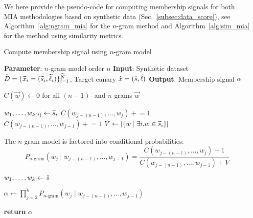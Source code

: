 We here provide the pseudo-code for computing membership signals for both MIA methodologies based on synthetic data (Sec.~\ref{subsec:data_score}), see Algorithm~\ref{alg:ngram_mia} for the $n$-gram method and Algorithm~\ref{alg:sim_mia} for the method using similarity metrics. 

\begin{algorithm}
\caption{Compute membership signal using $n$-gram model}

\begin{algorithmic}[1]
\STATE \textbf{Parameter}: $n$-gram model order $n$
\STATE \textbf{Input}: Synthetic dataset ${\widetilde{D}} = \{ {\widetilde{x}}_i = ({\widetilde{s}}_i, {\widetilde{\ell}}_i) \}_{i=1}^{\widetilde{N}}$, Target canary ${\hat{x}} = ({\hat{s}}, {\hat{\ell}})$
\STATE \textbf{Output}: Membership signal $\alpha$

\STATE $C(\vec{w}) \gets 0$ for all $(n\!-\!1)$- and $n$-grams $\vec{w}$

    \STATE $w_1, \dots, w_{k(i)} \gets {\ensuremath{\widetilde{s}}}_i$
        \STATE $C(w_{j-(n-1)}, \dots, w_j) \mathrel{+}= 1$
        \STATE $C(w_{j-(n-1)}, \dots, w_{j-1}) \mathrel{+}= 1$
    \ENDFOR
\ENDFOR
\STATE $V \gets |\{w \mid \exists i. w \in {\ensuremath{\widetilde{s}}}_i  \}|$

\STATE The $n$-gram model is factored into conditional probabilities: \hfill {}
\[
P_{\text{$n$-gram}}(w_j \mid w_{j-(n-1)}, \dots, w_{j-1}) = \frac{C(w_{j-(n-1)}, \dots, w_j) + 1}{C(w_{j-(n-1)}, \dots, w_{j-1}) + V}
\]

\STATE $w_1, \dots, w_k \gets {\ensuremath{\hat{s}}}$
\hfill {}

\STATE $\alpha \gets \prod_{j=2}^k P_{\text{$n$-gram}}(w_j \mid w_{j-(n-1)}, \dots, w_{j-1})$

\STATE \textbf{return} $\alpha$
\end{algorithmic}
\label{alg:ngram_mia}
\end{algorithm}


